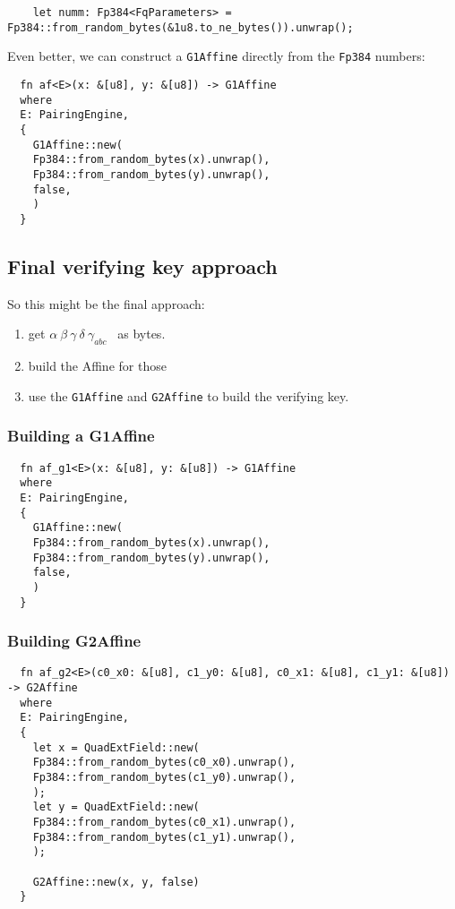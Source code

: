 \documentclass{article}
\newcommand{\inl}[1]{\lstinline{#1}}
\begin{document}
\begin{lstlisting}
    let numm: Fp384<FqParameters> = Fp384::from_random_bytes(&1u8.to_ne_bytes()).unwrap();
\end{lstlisting}

Even better, we can construct a \inl{G1Affine} directly from the \inl{Fp384} numbers:

\begin{lstlisting}
  fn af<E>(x: &[u8], y: &[u8]) -> G1Affine
  where
  E: PairingEngine,
  {
    G1Affine::new(
    Fp384::from_random_bytes(x).unwrap(),
    Fp384::from_random_bytes(y).unwrap(),
    false,
    )
  }
\end{lstlisting}


\subsection{Final verifying key approach}
So this might be the final approach:

\begin{enumerate}
\item get \( \alpha \ \beta \ \gamma \ \delta \ \gamma_{abc} \) \ as bytes.
\item build the Affine for those
\item use the \inl{G1Affine} and \inl{G2Affine} to build the verifying key.
\end{enumerate}

\subsubsection{Building a G1Affine}
\begin{lstlisting}
  fn af_g1<E>(x: &[u8], y: &[u8]) -> G1Affine
  where
  E: PairingEngine,
  {
    G1Affine::new(
    Fp384::from_random_bytes(x).unwrap(),
    Fp384::from_random_bytes(y).unwrap(),
    false,
    )
  }
\end{lstlisting}

\subsubsection{Building G2Affine}
\begin{lstlisting}
  fn af_g2<E>(c0_x0: &[u8], c1_y0: &[u8], c0_x1: &[u8], c1_y1: &[u8]) -> G2Affine
  where
  E: PairingEngine,
  {
    let x = QuadExtField::new(
    Fp384::from_random_bytes(c0_x0).unwrap(),
    Fp384::from_random_bytes(c1_y0).unwrap(),
    );
    let y = QuadExtField::new(
    Fp384::from_random_bytes(c0_x1).unwrap(),
    Fp384::from_random_bytes(c1_y1).unwrap(),
    );

    G2Affine::new(x, y, false)
  }
\end{lstlisting}
\end{document}
